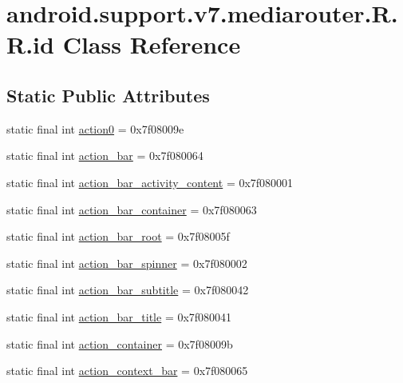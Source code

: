 \hypertarget{classandroid_1_1support_1_1v7_1_1mediarouter_1_1_r_1_1id}{
\section{android.support.v7.mediarouter.R.R.id Class Reference}
\label{classandroid_1_1support_1_1v7_1_1mediarouter_1_1_r_1_1id}
}
\subsection*{Static Public Attributes}
\begin{CompactItemize}
\item 
static final int \hyperlink{classandroid_1_1support_1_1v7_1_1mediarouter_1_1_r_1_1id_390e36d0fd814c9bfbdc977eb9b28ed1}{action0} = 0x7f08009e
\item 
static final int \hyperlink{classandroid_1_1support_1_1v7_1_1mediarouter_1_1_r_1_1id_54699298c2c08d603fb1a4208ddfbf83}{action\_\-bar} = 0x7f080064
\item 
static final int \hyperlink{classandroid_1_1support_1_1v7_1_1mediarouter_1_1_r_1_1id_cb25fe46760976c9a111b970e8a37ea2}{action\_\-bar\_\-activity\_\-content} = 0x7f080001
\item 
static final int \hyperlink{classandroid_1_1support_1_1v7_1_1mediarouter_1_1_r_1_1id_996435f5a2341927f0db57d570ae7554}{action\_\-bar\_\-container} = 0x7f080063
\item 
static final int \hyperlink{classandroid_1_1support_1_1v7_1_1mediarouter_1_1_r_1_1id_7c3fba35bee9af30bbf328b3f3a36284}{action\_\-bar\_\-root} = 0x7f08005f
\item 
static final int \hyperlink{classandroid_1_1support_1_1v7_1_1mediarouter_1_1_r_1_1id_7599b85a5664d76e0239f30d119aea62}{action\_\-bar\_\-spinner} = 0x7f080002
\item 
static final int \hyperlink{classandroid_1_1support_1_1v7_1_1mediarouter_1_1_r_1_1id_f4db243b7a996feea8ef50492fb4905c}{action\_\-bar\_\-subtitle} = 0x7f080042
\item 
static final int \hyperlink{classandroid_1_1support_1_1v7_1_1mediarouter_1_1_r_1_1id_816055351a5c979328ba160ff9b927ad}{action\_\-bar\_\-title} = 0x7f080041
\item 
static final int \hyperlink{classandroid_1_1support_1_1v7_1_1mediarouter_1_1_r_1_1id_0f2a739d0a087c42ab5ca27744243818}{action\_\-container} = 0x7f08009b
\item 
static final int \hyperlink{classandroid_1_1support_1_1v7_1_1mediarouter_1_1_r_1_1id_291d607ed0e30687593ed8ddc6d289e4}{action\_\-context\_\-bar} = 0x7f080065

\end{CompactItemize}
